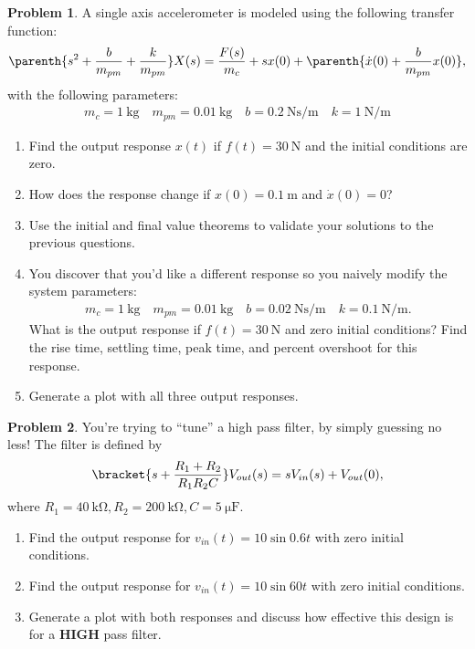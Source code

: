 \documentclass[10pt]{article}
\theoremstyle{definition}
\newtheorem{prob}{Problem}[section]
\newenvironment{subprob}%
{\renewcommand{\theenumi}{\alph{enumi}}\renewcommand{\labelenumi}{(\theenumi)}\begin{enumerate}}%
{\end{enumerate}}%
\begin{document}
\begin{prob}
    A single axis accelerometer is modeled using the following transfer function:
    \begin{align}
        \parenth{s^2 + \frac{b}{m_{pm}} + \frac{k}{m_{pm}}} X(s) = \frac{F(s)}{m_c} + s x(0) + \parenth{\dot{x}(0) + \frac{b}{m_{pm}} x(0)},
    \end{align}
    with the following parameters:
    \begin{align*}
        m_c = \SI{1}{\kilo\gram} \quad m_{pm} = \SI{0.01}{\kilo\gram} \quad b = \SI{0.2}{\newton\second\per\meter} \quad k = \SI{1}{\newton\per\meter}
    \end{align*}

    \begin{subprob}
        \item Find the output response \( x(t) \) if \( f(t) = \SI{30}{\newton}\) and the initial conditions are zero.
        \item How does the response change if \( x(0) = \SI{0.1}{\meter} \) and \( \dot{x}(0) = 0 \)?
        \item Use the initial and final value theorems to validate your solutions to the previous questions.
        \item You discover that you'd like a different response so you naively modify the system parameters:
            \begin{align*}
        m_c = \SI{1}{\kilo\gram} \quad m_{pm} = \SI{0.01}{\kilo\gram} \quad b = \SI{0.02}{\newton\second\per\meter} \quad k = \SI{0.1}{\newton\per\meter}.
            \end{align*}
            What is the output response if \( f(t) = \SI{30}{\newton} \) and zero initial conditions?
            Find the rise time, settling time, peak time, and percent overshoot for this response.
        \item Generate a plot with all three output responses.
    \end{subprob}
\end{prob}
   
\begin{prob}
    You're trying to ``tune'' a high pass filter,  by simply guessing no less!
    The filter is defined by
    \begin{align}
    \bracket{s + \frac{R_1 + R_2}{R_1 R_2 C} } V_{out}(s) = s V_{in}(s) + V_{out}(0) ,
    \end{align}
    where \( R_1 = \SI{40}{\kilo\ohm}, R_2 = \SI{200}{\kilo\ohm}, C = \SI{5}{\micro\farad}\).
    \begin{subprob}
    \item Find the output response for \( v_{in}(t) = 10 \sin 0.6 t \) with zero initial conditions.
    \item Find the output response for \( v_{in}(t) = 10 \sin 60 t \) with zero initial conditions.
    \item  Generate a plot with both responses and discuss how effective this design is for a \textbf{HIGH} pass filter.
    \end{subprob}
\end{prob}
\end{document}
